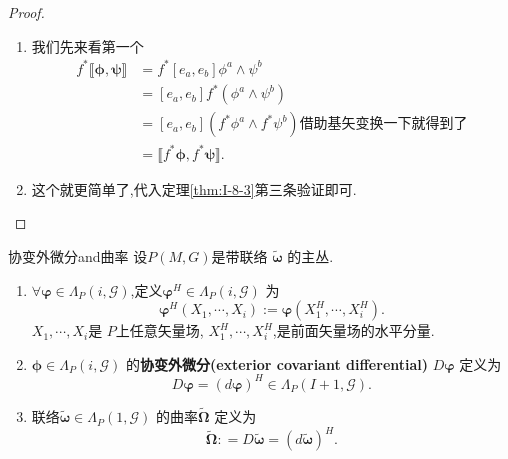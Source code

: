 \documentclass[../main.tex]{subfiles}
\begin{document}
\begin{proof}
 \begin{enumerate}
   \item  我们先来看第一个
     \begin{align*}
       f^* \llbracket \bm{\phi} ,\bm{\psi}  \rrbracket &= f^* [e_a,e_b] \phi^a \wedge \psi^b \\
                                                       & = [e_a,e_b]f^*(\phi^a \wedge \psi^b)\\
                                                       & = [e_a,e_b] (f^*\phi^a \wedge f^* \psi^b)\text{借助基矢变换一下就得到了}\\
                                                       &=  \llbracket f^* \bm{\phi} ,f^*\bm{\psi}  \rrbracket 
     .\end{align*}
   \item 这个就更简单了,代入定理\ref{thm:I-8-3}第三条验证即可.
 \end{enumerate} 
\end{proof}
\begin{definition}
  {}{协变外微分and曲率}
设$P(M,G)$是带联络 $\tilde{\bm{\omega} }$ 的主丛.
\begin{enumerate}
  \item $\forall \bm{\varphi} \in \Lambda_P(i,\mathscr{G}) $,定义$\bm{\varphi}^H \in \Lambda_P(i,\mathscr{G}) $ 为\[
  \bm{\varphi}^H(X_1,\cdots ,X_i) := \bm{\varphi}(X_1^H, \cdots ,X_i^H) 
  .\]  
  $X_1,\cdots,X_i$是 $P$上任意矢量场, $X_1^H,\cdots ,X_i^H$,是前面矢量场的水平分量. 
\item $\bm{\phi} \in \Lambda_P(i,\mathscr{G}) $ 的\textbf{协变外微分(exterior covariant differential)} $D \bm{\varphi} $ 定义为\[
D \bm{\varphi} = (d\bm{\varphi} )^H \in \Lambda_P (I+1,\mathscr{G}) 
.\] 
\item 联络$\tilde{\bm{\omega} } \in \Lambda_P(1,\mathscr{G})$ 的曲率$\tilde{\bm{\Omega} }$ 定义为\[
\tilde{\bm{\Omega} }: = D\tilde{\bm{\omega} } = (d\tilde{\bm{\omega} })^H
.\] 
\end{enumerate}
\end{definition}
\end{document}
